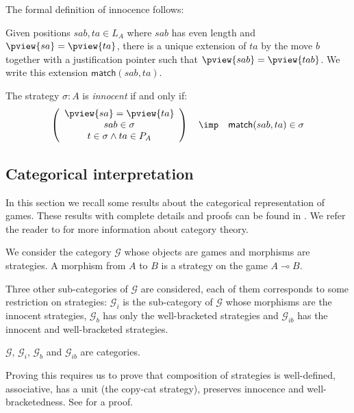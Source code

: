 The formal definition of innocence follows:
\begin{definition}[Innocence]
Given positions $sab, ta \in L_A$ where $sab$ has even length and
$\pview{sa} = \pview{ta}$, there is a unique extension of $ta$ by
the move $b$ together with a justification pointer such that
$\pview{sab} = \pview{tab}$. We write this extension
$\textsf{match}(sab,ta)$.

The strategy $\sigma:A$ is \emph{innocent} if and only if:
$$ \left(
     \begin{array}{c}
       \pview{sa} = \pview{ta} \\
       sab \in \sigma \\
       t\in \sigma \wedge ta \in P_A \\
     \end{array}
   \right)
\quad \imp\quad  \textsf{match}(sab,ta) \in \sigma$$

\end{definition}


\subsection{Categorical interpretation}

In this section we recall some results about the categorical
representation of games. These results with complete details and
proofs can be found in \cite{McC96b,hylandong_pcf,abramsky94full}.
We refer the reader to \cite{CroleRL:catt} for more information
about category theory.

We consider the category $\mathcal{G}$ whose objects are games and morphisms are
strategies. A morphism from $A$ to $B$ is a strategy on the game $A \multimap B$.

Three other sub-categories of $\mathcal{G}$ are considered, each of
them corresponds to some restriction on strategies: $\mathcal{G}_i$
is the sub-category of $\mathcal{G}$ whose morphisms are the
innocent strategies, $\mathcal{G}_b$ has only the well-bracketed
strategies and $\mathcal{G}_{ib}$ has the innocent and
well-bracketed strategies.

\begin{proposition}
$\mathcal{G}$, $\mathcal{G}_i$, $\mathcal{G}_b$ and $\mathcal{G}_{ib}$ are categories.
\end{proposition}

Proving this requires us to prove that composition of strategies is
well-defined, associative, has a unit (the copy-cat strategy),
preserves innocence and well-bracketedness. See
\cite{hylandong_pcf,abramsky94full} for a proof.


